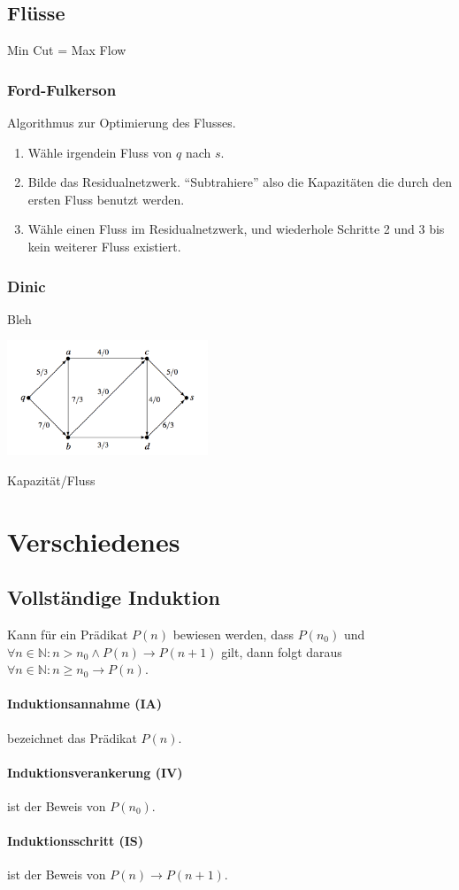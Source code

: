 \documentclass[a4paper, 9pt, DIV=20]{scrartcl}
\newcommand{\N}{\mathbb{N}}
\begin{document}
\subsection{Flüsse}
Min Cut = Max Flow

\subsubsection{Ford-Fulkerson}
Algorithmus zur Optimierung des Flusses.
\begin{enumerate}
\item Wähle irgendein Fluss von $q$ nach $s$.
\item Bilde das Residualnetzwerk. ``Subtrahiere'' also die Kapazitäten die durch den ersten Fluss benutzt werden. 
\item Wähle einen Fluss im Residualnetzwerk, und wiederhole Schritte 2 und 3 bis kein weiterer Fluss existiert.
\end{enumerate}

\subsubsection{Dinic} Bleh

\begin{center}
\includegraphics[width=6cm]{FlowExample}

Kapazität/Fluss
\end{center}

\section{Verschiedenes}

\subsection{Vollständige Induktion}
Kann für ein Prädikat $P(n)$ bewiesen werden, dass $P(n_0)$ und $\forall n\in\N: n > n_0 \wedge P(n) \to P(n+1)$ gilt,
dann folgt daraus $\forall n\in\N: n \geq n_0 \rightarrow P(n)$.

\paragraph{Induktionsannahme (IA)} bezeichnet das Prädikat $P(n)$.

\paragraph{Induktionsverankerung (IV)} ist der Beweis von $P(n_0)$.

\paragraph{Induktionsschritt (IS)} ist der Beweis von $P(n) \rightarrow P(n+1)$.
\end{document}

